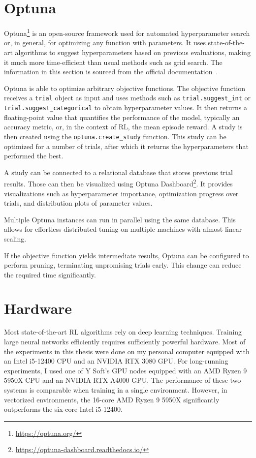 \documentclass[
  digital,     %
  oneside,     %
  nosansbold,  %
  nocolorbold, %
  lof,         %
  lot,         %
]{fithesis4}
\begin{document}
\section{Optuna}
\label{sec:optuna}

Optuna\footnote{\url{https://optuna.org/}} is an open-source framework used for automated hyperparameter search or, in general, for optimizing any function with parameters. It uses state-of-the-art algorithms to suggest hyperparameters based on previous evaluations, making it much more time-efficient than usual methods such as grid search. The information in this section is sourced from the official documentation~\cite{optuna-docs}.

Optuna is able to optimize arbitrary objective functions. The objective function receives a \texttt{trial} object as input and uses methods such as \texttt{trial.suggest\_int} or \texttt{trial.suggest\_categorical} to obtain hyperparameter values. It then returns a floating-point value that quantifies the performance of the model, typically an accuracy metric, or, in the context of RL, the mean episode reward. A study is then created using the \texttt{optuna.create\_study} function. This study can be optimized for a number of trials, after which it returns the hyperparameters that performed the best.

A study can be connected to a relational database that stores previous trial results. Those can then be visualized using Optuna Dashboard\footnote{\url{https://optuna-dashboard.readthedocs.io/}}. It provides visualizations such as hyperparameter importance, optimization progress over trials, and distribution plots of parameter values.

Multiple Optuna instances can run in parallel using the same database. This allows for effortless distributed tuning on multiple machines with almost linear scaling.

If the objective function yields intermediate results, Optuna can be configured to perform pruning, terminating unpromising trials early. This change can reduce the required time significantly.

\section{Hardware}

Most state-of-the-art RL algorithms rely on deep learning techniques. Training large neural networks efficiently requires sufficiently powerful hardware. Most of the experiments in this thesis were done on my personal computer equipped with an Intel i5-12400 CPU and an NVIDIA RTX 3080 GPU. For long-running experiments, I used one of Y Soft's GPU nodes equipped with an AMD Ryzen 9 5950X CPU and an NVIDIA RTX A4000 GPU. The performance of these two systems is comparable when training in a single environment. However, in vectorized environments, the 16-core AMD Ryzen 9 5950X significantly outperforms the six-core Intel i5-12400.
\end{document}
